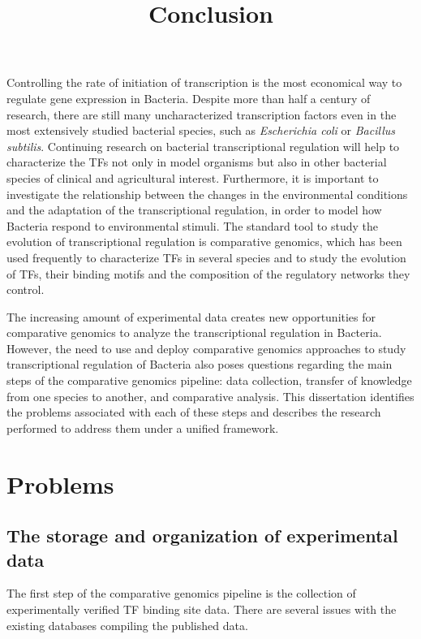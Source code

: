 \documentclass[12pt]{article}
\title{Conclusion}
\date{}
\begin{document}
\linenumbers
\doublespacing

\maketitle

Controlling the rate of initiation of transcription is the most economical way
to regulate gene expression in Bacteria. Despite more than half a century of
research, there are still many uncharacterized transcription factors even in
the most extensively studied bacterial species, such as \textit{Escherichia
  coli} or \textit{Bacillus subtilis}. Continuing research on bacterial
transcriptional regulation will help to characterize the TFs not only in model
organisms but also in other bacterial species of clinical and agricultural
interest. Furthermore, it is important to investigate the relationship between the
changes in the environmental conditions and the adaptation of the
transcriptional regulation, in order to model how Bacteria respond to
environmental stimuli. The standard tool to study the evolution of
transcriptional regulation is comparative genomics, which has been used
frequently to characterize TFs in several species and to study the evolution of
TFs, their binding motifs and the composition of the regulatory networks they control.

The increasing amount of experimental data creates new opportunities for
comparative genomics to analyze the transcriptional regulation in
Bacteria. However, the need to use and deploy comparative genomics approaches
to study transcriptional regulation of Bacteria also poses questions regarding
the main steps of the comparative genomics pipeline: data collection, transfer
of knowledge from one species to another, and comparative analysis. This
dissertation identifies the problems associated with each of these steps and
describes the research performed to address them under a unified framework.

\section{Problems}

\subsection{The storage and organization of experimental data}

The first step of the comparative genomics pipeline is the collection of
experimentally verified TF binding site data. There are several issues with the
existing databases compiling the published data.
\end{document}
